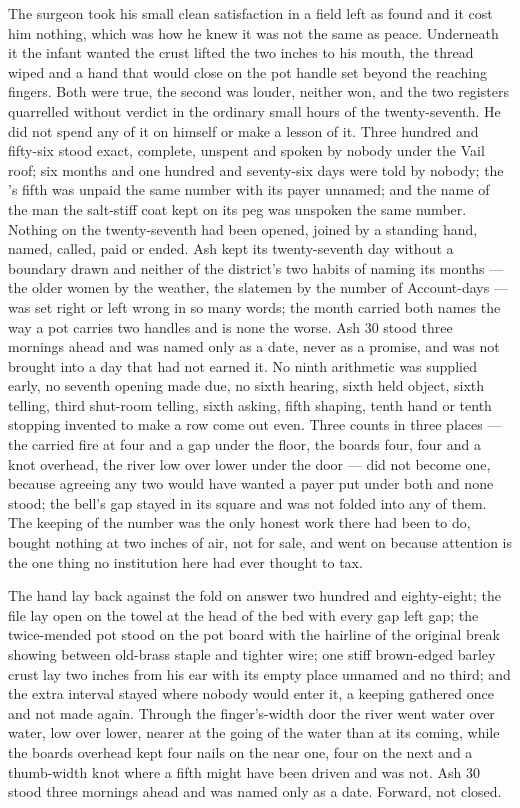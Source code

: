The surgeon took his small clean satisfaction in a field left as found and it cost him nothing, which was how he knew it was not the same as peace. Underneath it the infant wanted the crust lifted the two inches to his mouth, the thread wiped and a hand that would close on the pot handle set beyond the reaching fingers. Both were true, the second was louder, neither won, and the two registers quarrelled without verdict in the ordinary small hours of the twenty-seventh. He did not spend any of it on himself or make a lesson of it. Three hundred and fifty-six stood exact, complete, unspent and spoken by nobody under the Vail roof; six months and one hundred and seventy-six days were told by nobody; the 's fifth was unpaid the same number with its payer unnamed; and the name of the man the salt-stiff coat kept on its peg was unspoken the same number. Nothing on the twenty-seventh had been opened, joined by a standing hand, named, called, paid or ended. Ash kept its twenty-seventh day without a boundary drawn and neither of the district's two habits of naming its months --- the older women by the weather, the slatemen by the number of Account-days --- was set right or left wrong in so many words; the month carried both names the way a pot carries two handles and is none the worse. Ash 30 stood three mornings ahead and was named only as a date, never as a promise, and was not brought into a day that had not earned it. No ninth arithmetic was supplied early, no seventh opening made due, no sixth hearing, sixth held object, sixth telling, third shut-room telling, sixth asking, fifth shaping, tenth hand or tenth stopping invented to make a row come out even. Three counts in three places --- the carried fire at four and a gap under the floor, the boards four, four and a knot overhead, the river low over lower under the door --- did not become one, because agreeing any two would have wanted a payer put under both and none stood; the bell's gap stayed in its square and was not folded into any of them. The keeping of the number was the only honest work there had been to do, bought nothing at two inches of air, not for sale, and went on because attention is the one thing no institution here had ever thought to tax.

The hand lay back against the fold on answer two hundred and eighty-eight; the file lay open on the towel at the head of the bed with every gap left gap; the twice-mended pot stood on the pot board with the hairline of the original break showing between old-brass staple and tighter wire; one stiff brown-edged barley crust lay two inches from his ear with its empty place unnamed and no third; and the extra interval stayed where nobody would enter it, a keeping gathered once and not made again. Through the finger's-width door the river went water over water, low over lower, nearer at the going of the water than at its coming, while the boards overhead kept four nails on the near one, four on the next and a thumb-width knot where a fifth might have been driven and was not. Ash 30 stood three mornings ahead and was named only as a date. Forward, not closed.
